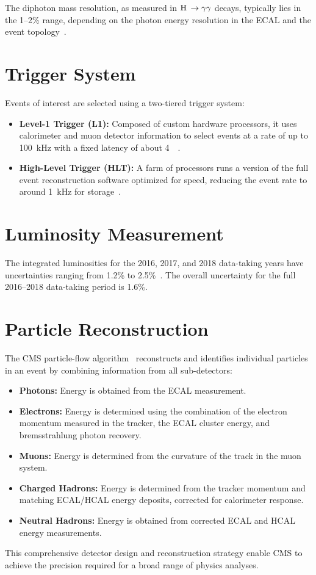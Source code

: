 The diphoton mass resolution, as measured in $\mathrm{H}\hspace{0.2em} \to \gamma\gamma$ decays,
typically lies in the 1--2\% range, depending on the photon energy resolution in the ECAL and
the event topology~\cite{CMS:2020xrn}.

\section*{Trigger System}

Events of interest are selected using a two-tiered trigger system:
\begin{itemize}
    \item \textbf{Level-1 Trigger (L1):} Composed of custom hardware processors,
    it uses calorimeter and muon detector information to select events at a rate of up to 100~\unit{kHz}
    with a fixed latency of about 4~\mus~\cite{Sirunyan:2020zal}.
    \item \textbf{High-Level Trigger (HLT):} A farm of processors runs a version of the full event
    reconstruction software optimized for speed, reducing the event rate to around 1~\unit{kHz}
    for storage~\cite{Khachatryan:2016bia}.
\end{itemize}

\section*{Luminosity Measurement}

The integrated luminosities for the 2016, 2017, and 2018 data-taking years have uncertainties ranging
from 1.2\% to 2.5\%~\cite{CMS-LUM-17-003, CMS-PAS-LUM-17-004, CMS-PAS-LUM-18-002}.
The overall uncertainty for the full 2016--2018 data-taking period is 1.6\%.

\section*{Particle Reconstruction}

The CMS particle-flow algorithm~\cite{CMS-PRF-14-001} reconstructs and identifies individual particles
in an event by combining information from all sub-detectors:
\begin{itemize}
    \item \textbf{Photons:} Energy is obtained from the ECAL measurement.
    \item \textbf{Electrons:} Energy is determined using the combination of the electron momentum
    measured in the tracker, the ECAL cluster energy, and bremsstrahlung photon recovery.
    \item \textbf{Muons:} Energy is determined from the curvature of the track in the muon system.
    \item \textbf{Charged Hadrons:} Energy is determined from the tracker momentum and matching
    ECAL/HCAL energy deposits, corrected for calorimeter response.
    \item \textbf{Neutral Hadrons:} Energy is obtained from corrected ECAL and HCAL energy
    measurements.
\end{itemize}

This comprehensive detector design and reconstruction strategy enable CMS to achieve the precision
required for a broad range of physics analyses.
